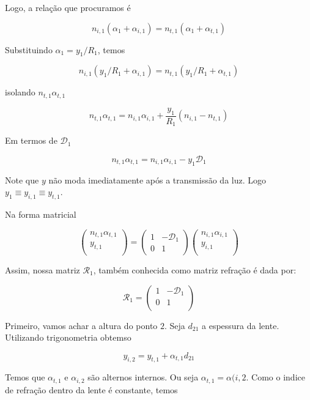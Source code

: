 \documentclass[11pt]{article}
\begin{document}
\begin{pproblem}
\begin{pssolution*}{}{}
\begin{alternativas}
            Logo, a relação que procuramos é 

            \[\boxed{n_{i,1}(\alpha_1+\alpha_{i,1}) = n_{t,1}(\alpha_1+\alpha_{t,1})}\]

            \item Substituindo \(\alpha_1 = y_1/R_1\), temos
            
            \[n_{i,1}(y_1/R_1+\alpha_{i,1})=n_{t,1}(y_1/R_1 +\alpha_{t,1})\]

            isolando \(n_{t,1}\alpha_{t,1}\)

            \[n_{t,1}\alpha_{t,1} = n_{i,1}\alpha_{i,1}+ \frac{y_1}{R_1}(n_{i,1}-n_{t,1})\]

            Em termos de \(\mathcal{D}_1\) 

            \[n_{t,1}\alpha_{t,1} = n_{i,1}\alpha_{i,1} - y_1\mathcal{D}_1\]

            Note que \(y\) não moda imediatamente após a transmissão da luz. Logo \(y_1\equiv y_{i,1}\equiv y_{t,1}\).

            \item Na forma matricial
            
            \[\left(\begin{matrix}
                n_{t,1}\alpha_{t,1} \\
                y_{t,1}\\
            \end{matrix}\right) = \left(\begin{matrix}
                1 & - \mathcal{D}_1 \\
                0 & 1
            \end{matrix}\right)\left(\begin{matrix}
                n_{i,1}\alpha_{i,1} \\
                y_{i,1}\\
            \end{matrix}\right)\]

            Assim, nossa matriz \(\mathcal{R}_1\), também conhecida como matriz refração é dada por:

            \[\boxed{\mathcal{R}_1 = \left(\begin{matrix}
            1 & -\mathcal{D}_1 \\
            0 & 1 \\
            \end{matrix}\right)}\]

        \item Primeiro, vamos achar a altura do ponto \(2\). Seja \(d_{21}\) a espessura da lente. Utilizando trigonometria obtemso
        
        \[y_{i,2} = y_{t,1} + \alpha_{t,1}d_{21}\]

        Temos que \(\alpha_{t,1}\) e \(\alpha_{i,2}\) são alternos internos. Ou seja \(\alpha_{t,1}=\alpha({i,2}\). Como o indice de refração dentro da lente é constante, temos
        \[\] 
        \end{alternativas}
\end{pssolution*}

\end{pproblem}
\end{document}
